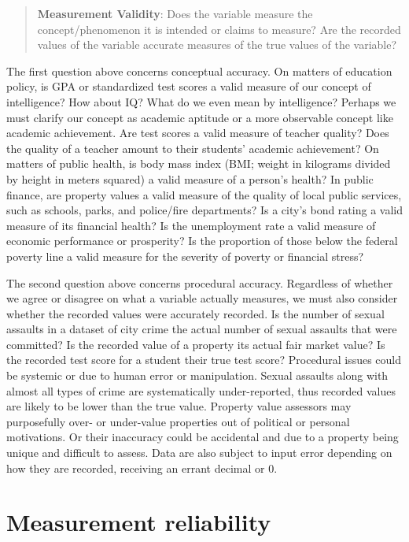 \documentclass[
]{book}
\begin{document}
\begin{quote}
\textbf{Measurement Validity}: Does the variable measure the concept/phenomenon it is intended or claims to measure? Are the recorded values of the variable accurate measures of the true values of the variable?
\end{quote}

The first question above concerns conceptual accuracy. On matters of education policy, is GPA or standardized test scores a valid measure of our concept of intelligence? How about IQ? What do we even mean by intelligence? Perhaps we must clarify our concept as academic aptitude or a more observable concept like academic achievement. Are test scores a valid measure of teacher quality? Does the quality of a teacher amount to their students' academic achievement? On matters of public health, is body mass index (BMI; weight in kilograms divided by height in meters squared) a valid measure of a person's health? In public finance, are property values a valid measure of the quality of local public services, such as schools, parks, and police/fire departments? Is a city's bond rating a valid measure of its financial health? Is the unemployment rate a valid measure of economic performance or prosperity? Is the proportion of those below the federal poverty line a valid measure for the severity of poverty or financial stress?

The second question above concerns procedural accuracy. Regardless of whether we agree or disagree on what a variable actually measures, we must also consider whether the recorded values were accurately recorded. Is the number of sexual assaults in a dataset of city crime the actual number of sexual assaults that were committed? Is the recorded value of a property its actual fair market value? Is the recorded test score for a student their true test score? Procedural issues could be systemic or due to human error or manipulation. Sexual assaults along with almost all types of crime are systematically under-reported, thus recorded values are likely to be lower than the true value. Property value assessors may purposefully over- or under-value properties out of political or personal motivations. Or their inaccuracy could be accidental and due to a property being unique and difficult to assess. Data are also subject to input error depending on how they are recorded, receiving an errant decimal or 0.

\hypertarget{measurement-reliability}{%
\section{Measurement reliability}\label{measurement-reliability}}
\end{document}
